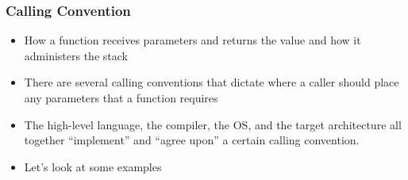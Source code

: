 \documentclass[]{beamer}
\begin{document}
\begin{frame}
  \frametitle{Calling Convention}
  \begin{itemize}
  \item{How a function receives parameters and returns the value and how it administers the stack}
  \item{There are several calling conventions that dictate where a caller should place any parameters that a function requires}
  \item{The high-level language, the compiler, the OS, and the target architecture all together ``implement'' and ``agree upon'' a certain calling convention.}
  \item{Let's look at some examples}
  \end{itemize}
\end{frame}
\end{document}
